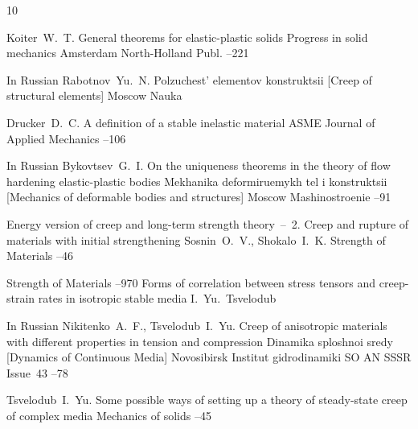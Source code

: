 \begin{thebibliography}{10}

\by Koiter~W.~T.
\paper   General theorems for elastic-plastic solids
\inbook  Progress in solid mechanics
\publaddr Amsterdam
\publ North-Holland Publ.
--221


\lang In Russian
\by Rabotnov~Yu.~N.
\book    Polzuchest' elementov konstruktsii \rm [Creep of structural elements]
\publaddr Moscow
\publ Nauka

\by Drucker~D.~C.
\paper A definition of a stable inelastic material
\jour ASME Journal of Applied Mechanics
--106


\lang In Russian
\by Bykovtsev~G.~I.
\paper On the uniqueness theorems in the theory of flow hardening elastic-plastic bodies
\inbook Mekhanika deformiruemykh tel i konstruktsii \rm [Mechanics of deformable bodies and structures]
\publaddr Moscow
\publ Mashinostroenie
--91


\paper Energy version of creep and long-term strength theory~--~2. Creep and rupture of materials with initial strengthening
\by Sosnin~O.~V., Shokalo~I.~K.
\jour Strength of Materials
--46


\jour Strength of Materials
--970
\paper Forms of correlation between stress tensors and creep-strain rates in isotropic stable media
\by  I.~Yu.~Tsvelodub

    
\lang In Russian
\by Nikitenko~A.~F., Tsvelodub~I.~Yu.
\paper Creep of anisotropic materials with different properties in tension and compression
\inbook Dinamika sploshnoi sredy \rm [Dynamics of Continuous Media]
\publaddr Novosibirsk
\publ Institut gidrodinamiki SO AN SSSR
\volinfo Issue~43
--78



    
\by Tsvelodub~I.~Yu.
\paper Some possible ways of setting up a theory of steady-state creep of complex media
\jour Mechanics of solids
--45
    

\end{thebibliography}
